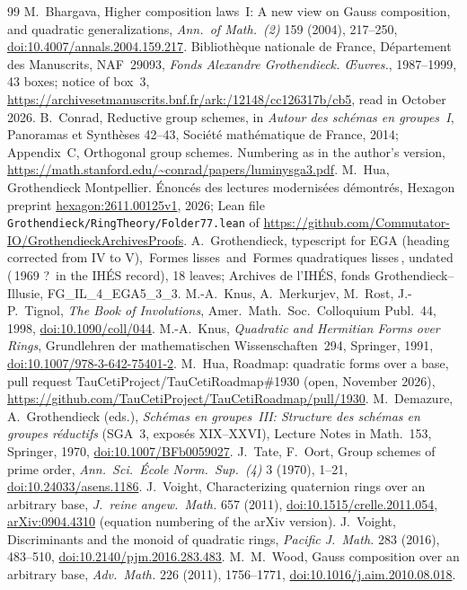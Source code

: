 \documentclass[11pt,a4paper]{amsart}
\newcommand{\q}[1]{\guillemotleft\,#1\,\guillemotright}
\theoremstyle{plain}
\theoremstyle{definition}
\begin{document}
\begin{thebibliography}{99}
 M.~Bhargava, Higher composition laws~I: A new view on Gauss composition, and quadratic generalizations, \emph{Ann.\ of Math.~(2)} 159 (2004), 217--250, \href{https://doi.org/10.4007/annals.2004.159.217}{doi:10.4007/annals.2004.159.217}.
 Bibliothèque nationale de France, Département des Manuscrits, NAF~29093, \emph{Fonds Alexandre Grothendieck. \OE uvres.}, 1987--1999, 43 boxes; notice of box~3, \url{https://archivesetmanuscrits.bnf.fr/ark:/12148/cc126317b/cb5}, read in October 2026.
 B.~Conrad, Reductive group schemes, in \emph{Autour des schémas en groupes~I}, Panoramas et Synthèses 42--43, Société mathématique de France, 2014; Appendix~C, Orthogonal group schemes. Numbering as in the author's version, \url{https://math.stanford.edu/~conrad/papers/luminysga3.pdf}.
 M.~Hua, Grothendieck Montpellier. Énoncés des lectures modernisées démontrés, Hexagon preprint \href{https://hexagonmath.org/2611.00125v1}{hexagon:2611.00125v1}, 2026; Lean file \texttt{Grothendieck/RingTheory/Folder77.lean} of \url{https://github.com/Commutator-IO/GrothendieckArchivesProofs}.
 A.~Grothendieck, typescript for EGA (heading corrected from IV to V), \q{Formes lisses} and \q{Formes quadratiques lisses}, undated (\q{1969 ?} in the IHÉS record), 18 leaves; Archives de l'IHÉS, fonds Grothendieck--Illusie, FG\_IL\_4\_EGA5\_3\_3.
 M.-A.~Knus, A.~Merkurjev, M.~Rost, J.-P.~Tignol, \emph{The Book of Involutions}, Amer.\ Math.\ Soc.\ Colloquium Publ.~44, 1998, \href{https://doi.org/10.1090/coll/044}{doi:10.1090/coll/044}.
 M.-A.~Knus, \emph{Quadratic and Hermitian Forms over Rings}, Grundlehren der mathematischen Wissenschaften~294, Springer, 1991, \href{https://doi.org/10.1007/978-3-642-75401-2}{doi:10.1007/978-3-642-75401-2}.
 M.~Hua, Roadmap: quadratic forms over a base, pull request TauCetiProject/TauCetiRoadmap\#1930 (open, November 2026), \url{https://github.com/TauCetiProject/TauCetiRoadmap/pull/1930}.
 M.~Demazure, A.~Grothendieck (eds.), \emph{Schémas en groupes~III: Structure des schémas en groupes réductifs} (SGA~3, exposés XIX--XXVI), Lecture Notes in Math.~153, Springer, 1970, \href{https://doi.org/10.1007/BFb0059027}{doi:10.1007/BFb0059027}.
 J.~Tate, F.~Oort, Group schemes of prime order, \emph{Ann.\ Sci.\ École Norm.\ Sup.~(4)} 3 (1970), 1--21, \href{https://doi.org/10.24033/asens.1186}{doi:10.24033/asens.1186}.
 J.~Voight, Characterizing quaternion rings over an arbitrary base, \emph{J.\ reine angew.\ Math.} 657 (2011), \href{https://doi.org/10.1515/crelle.2011.054}{doi:10.1515/crelle.2011.054}, \href{https://arxiv.org/abs/0904.4310}{arXiv:0904.4310} (equation numbering of the arXiv version).
 J.~Voight, Discriminants and the monoid of quadratic rings, \emph{Pacific J.\ Math.} 283 (2016), 483--510, \href{https://doi.org/10.2140/pjm.2016.283.483}{doi:10.2140/pjm.2016.283.483}.
 M.~M.~Wood, Gauss composition over an arbitrary base, \emph{Adv.\ Math.} 226 (2011), 1756--1771, \href{https://doi.org/10.1016/j.aim.2010.08.018}{doi:10.1016/j.aim.2010.08.018}.
\end{thebibliography}
\end{document}
